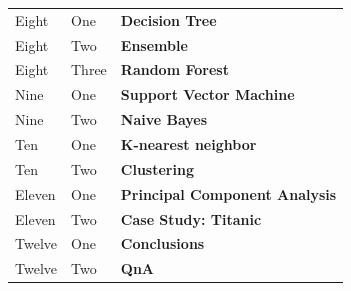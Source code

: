 \documentclass[a4paper, 11pt]{article}
\begin{document}
\begin{center}
\begin{tabular}{ |p{1cm}|p{1cm}||p{10cm}|}
\hline
Eight   &  	One    	& 	\textbf{Decision Tree} \\
Eight  	&  	Two    	& 	\textbf{Ensemble} \\
Eight  	&  	Three   & 	\textbf{Random Forest} \\
\hline
Nine   	&  	One    	& 	\textbf{Support Vector Machine} \\
Nine  	&  	Two    	& 	\textbf{Naive Bayes} \\
\hline
Ten   	&  	One    	& 	\textbf{K-nearest neighbor} \\
Ten  	&  	Two    	& 	\textbf{Clustering} \\
\hline
Eleven 	&  	One    	& 	\textbf{Principal Component Analysis} \\
Eleven 	&  	Two    	& 	\textbf{Case Study: Titanic} \\
\hline
Twelve 	&  	One    	& 	\textbf{Conclusions} \\
Twelve 	&  	Two    	& 	\textbf{QnA} \\
\hline
\end{tabular}
\end{center}
\end{document}
